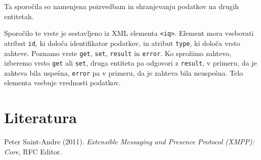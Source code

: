 \documentclass[11pt]{article}
\begin{document}
Ta sporočila so namenjena poizvedbam in shranjevanju podatkov na
drugih entitetah.

Sporočilo te vrste je sestavljeno iz XML elementa \texttt{<iq>}. Element mora
vsebovati atribut \texttt{id}, ki določa identifikator podatkov, in atribut
\texttt{type}, ki določa vrsto zahteve. Poznamo vrste \texttt{get}, \texttt{set}, \texttt{result}
in \texttt{error}. Ko sprožimo zahtevo, izberemo vrsto \texttt{get} ali \texttt{set}, druga
entiteta pa odgovori z \texttt{result}, v primeru, da je zahteva bila
uspešna, \texttt{error} pa v primeru, da je zahteva bila neuspešna. Telo
elementa vsebuje vrednosti podatkov.

\section{Literatura}
\label{sec:org3acbfa3}

\noindent
Peter Saint-Andre (2011). \emph{{Extensible Messaging and Presence Protocol (XMPP): Core}}, RFC Editor.
\end{document}
